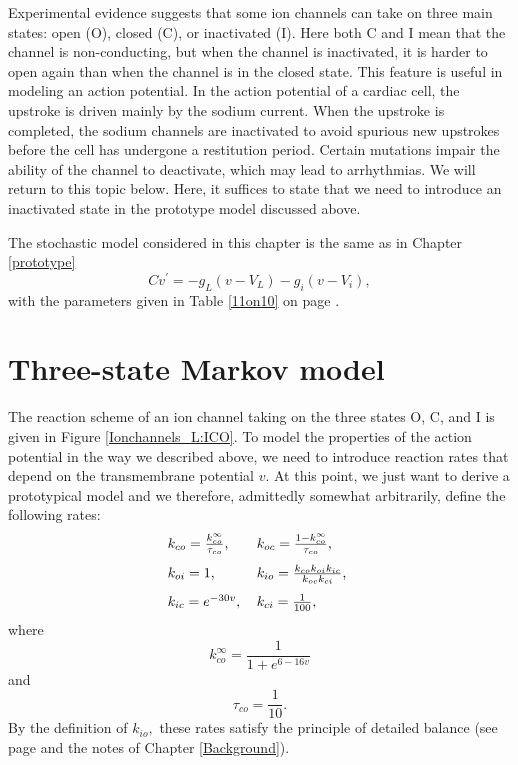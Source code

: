 Experimental evidence suggests that some ion channels can take on three main
states: open (O), closed (C), or inactivated (I). Here both C and I mean that
the channel is non-conducting, but when the channel is inactivated, it is harder
to open again than when the channel is in the closed state. This feature is
useful in modeling an action potential. In the action potential of a
cardiac cell, the upstroke is driven mainly by the sodium current. When the
upstroke is completed, the sodium channels are inactivated to avoid
spurious new upstrokes before the cell has undergone a restitution period. 
Certain mutations impair the ability of the channel to deactivate, which
may lead to arrhythmias. We will return to this topic below. Here,
it suffices to state that we need to introduce an inactivated state in the
prototype model discussed above.

The stochastic model considered in this chapter is the same as in Chapter \ref{prototype}
\begin{equation}
Cv^{\prime}=-g_{L}\left(  v-V_{L}\right)  -g_{i}(v-V_{i}), \label{v1b}
\end{equation}
with the parameters given in Table \ref{11on10} on page \pageref{11on10}.



\section{Three-state Markov model}
The reaction scheme of an ion channel taking on the three states O, C, and I
is given in Figure \ref{Ionchannels_L:ICO}. To model the properties of the action
potential in the way we described above, we need to introduce reaction rates
that depend on the transmembrane potential $v$. At this point, we just want to
derive a prototypical model and we therefore, admittedly somewhat arbitrarily,
define the following rates:
\begin{equation}
\begin{tabular}
[c]{ll}
$k_{co}=\frac{k_{co}^{\infty}}{\tau_{co}}$, & $k_{oc}=\frac{1-k_{co}^{\infty}
}{\tau_{co}}$,\\[3 mm]
$k_{oi}=1$, & $k_{io}=\frac{k_{co}k_{oi}k_{ic}}{k_{oc}k_{ci}}$,\\[3 mm]
$k_{ic}=e^{-30v}$, & $k_{ci}=\frac{1}{100}$,
\end{tabular}
\ \label{ratesv}
\end{equation}
where
\[
k_{co}^{\infty}  =\frac{1}{1+e^{6-16v}}
\]
and
\[
\tau_{co}  =\frac{1}{10}.
\]
By the definition of $k_{io},$ these rates satisfy the principle of detailed
balance (see page \pageref{db} and the notes of Chapter \ref{Background}).

